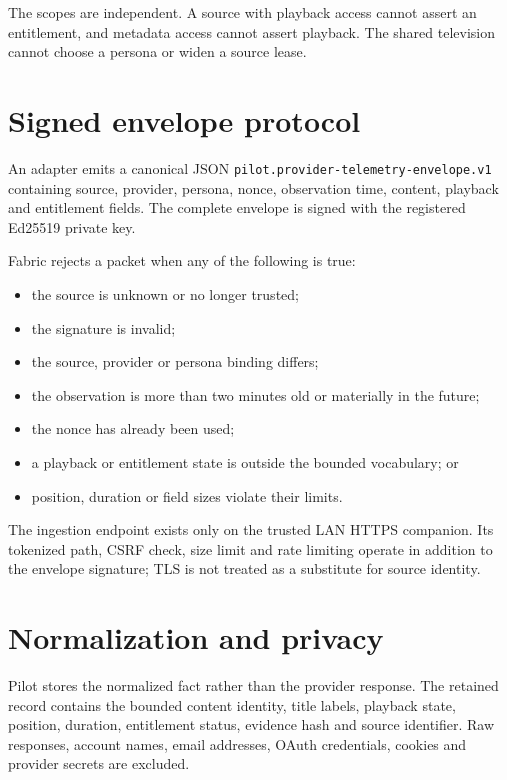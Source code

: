 \documentclass[11pt,a4paper]{article}
\begin{document}
The scopes are independent. A source with playback access cannot assert an
entitlement, and metadata access cannot assert playback. The shared television
cannot choose a persona or widen a source lease.

\section{Signed envelope protocol}

An adapter emits a canonical JSON
\texttt{pilot.provider-telemetry-envelope.v1} containing source, provider,
persona, nonce, observation time, content, playback and entitlement fields. The
complete envelope is signed with the registered Ed25519 private key.

Fabric rejects a packet when any of the following is true:

\begin{itemize}
  \item the source is unknown or no longer trusted;
  \item the signature is invalid;
  \item the source, provider or persona binding differs;
  \item the observation is more than two minutes old or materially in the future;
  \item the nonce has already been used;
  \item a playback or entitlement state is outside the bounded vocabulary; or
  \item position, duration or field sizes violate their limits.
\end{itemize}

The ingestion endpoint exists only on the trusted LAN HTTPS companion. Its
tokenized path, CSRF check, size limit and rate limiting operate in addition to
the envelope signature; TLS is not treated as a substitute for source identity.

\section{Normalization and privacy}

Pilot stores the normalized fact rather than the provider response. The retained
record contains the bounded content identity, title labels, playback state,
position, duration, entitlement status, evidence hash and source identifier.
Raw responses, account names, email addresses, OAuth credentials, cookies and
provider secrets are excluded.
\end{document}
